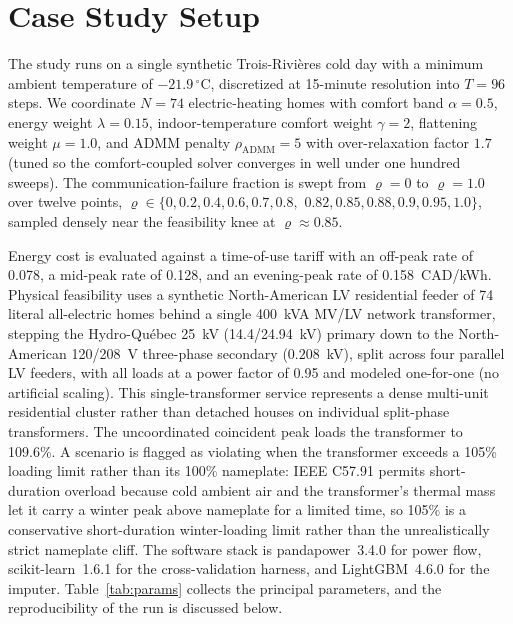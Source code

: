 \section{Case Study Setup}
\label{sec:casestudy}

The study runs on a single synthetic Trois-Rivi\`eres cold day with a minimum
ambient temperature of $-21.9\,^{\circ}\mathrm{C}$, discretized at 15-minute
resolution into $T = 96$ steps. We coordinate $N = 74$ electric-heating homes
with comfort band $\alpha = 0.5$, energy weight $\lambda = 0.15$,
indoor-temperature comfort weight $\gamma = 2$, flattening weight $\mu = 1.0$, and
ADMM penalty $\rho_{\mathrm{ADMM}} = 5$ with over-relaxation factor $1.7$ (tuned so
the comfort-coupled solver converges in well under one hundred sweeps). The
communication-failure fraction is
swept from $\varrho = 0$ to $\varrho = 1.0$ over twelve points,
$\varrho \in \{0, 0.2, 0.4, 0.6, 0.7, 0.8,$ $0.82, 0.85, 0.88, 0.9, 0.95, 1.0\}$,
sampled densely near the feasibility knee at $\varrho \approx 0.85$.

Energy cost is evaluated against a time-of-use tariff with an off-peak rate of
0.078, a mid-peak rate of 0.128, and an evening-peak rate of 0.158~CAD/kWh.
Physical feasibility uses a synthetic North-American LV residential feeder of 74
literal all-electric homes behind a single 400~kVA MV/LV network transformer,
stepping the Hydro-Qu\'ebec 25~kV (14.4/24.94~kV) primary down to the
North-American 120/208~V three-phase secondary ($0.208$~kV), split across four
parallel LV feeders, with all loads at a power factor of 0.95 and modeled
one-for-one (no artificial scaling). This single-transformer service represents a
dense multi-unit residential cluster rather than detached houses on individual
split-phase transformers. The uncoordinated coincident peak
loads the transformer to 109.6\%. A scenario is flagged as violating when the
transformer exceeds a 105\% loading limit rather than its 100\% nameplate: IEEE
C57.91 permits short-duration overload because cold ambient air and the
transformer's thermal mass let it carry a winter peak above nameplate for a
limited time, so 105\% is a conservative short-duration winter-loading limit
rather than the unrealistically strict nameplate cliff.
The software stack is pandapower~3.4.0 for power flow, scikit-learn~1.6.1 for the
cross-validation harness, and LightGBM~4.6.0 for the imputer.
Table~\ref{tab:params} collects the principal parameters, and the reproducibility
of the run is discussed below.

